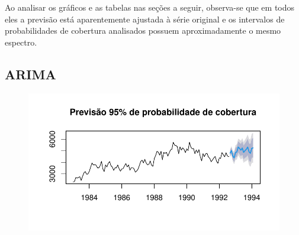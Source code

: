 \documentclass[
  letterpaper,
  DIV=11,
  numbers=noendperiod]{scrartcl}
\begin{document}
Ao analisar os gráficos e as tabelas nas seções a seguir, observa-se que
em todos eles a previsão está aparentemente ajustada à série original e
os intervalos de probabilidades de cobertura analisados possuem
aproximadamente o mesmo espectro.

\newpage{}

\hypertarget{arima}{%
\subsection{ARIMA}\label{arima}}

\begin{figure}

{\centering \includegraphics{T2_grupo5_files/figure-pdf/previsao-pontual-arima-1.pdf}

}

\end{figure}
\end{document}
